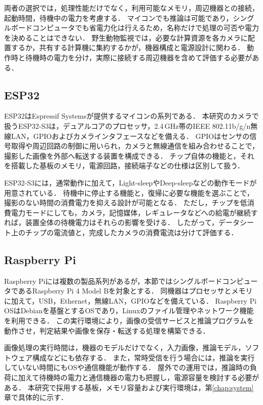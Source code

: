 両者の選択では，処理性能だけでなく，利用可能なメモリ，周辺機器との接続，起動時間，待機中の電力を考慮する．
マイコンでも推論は可能であり，シングルボードコンピュータでも省電力化は行えるため，名称だけで処理の可否や電力を決めることはできない．
野生動物監視では，必要な計算資源を各カメラに配置するか，共有する計算機に集約するかが，機器構成と電源設計に関わる．
動作時と待機時の電力を分け，実際に接続する周辺機器を含めて評価する必要がある\cite{Sato2022}．

\subsection{ESP32}
ESP32はEspressif Systemsが提供するマイコンの系列である．
本研究のカメラで扱うESP32-S3は，デュアルコアのプロセッサ，2.4\,GHz帯のIEEE 802.11b/g/n無線LAN，GPIOおよびカメラインタフェースなどを備える\cite{ESP32S3}．
GPIOはセンサの信号取得や周辺回路の制御に用いられ，カメラと無線通信を組み合わせることで，撮影した画像を外部へ転送する装置を構成できる．
チップ自体の機能と，それを搭載した基板のメモリ，電源回路，接続端子などの仕様は区別して扱う．

ESP32-S3には，通常動作に加えて，Light-sleepやDeep-sleepなどの動作モードが用意されている\cite{ESP32S3}．
待機中に停止する機能と，復帰に必要な機能を選ぶことで，撮影のない時間の消費電力を抑える設計が可能となる．
ただし，チップを低消費電力モードにしても，カメラ，記憶媒体，レギュレータなどへの給電が継続すれば，装置全体の待機電力はそれらの影響を受ける．
したがって，データシート上のチップの電流値と，完成したカメラの消費電流は分けて評価する．

\subsection{Raspberry Pi}
Raspberry Piには複数の製品系列があるが，本節ではシングルボードコンピュータであるRaspberry Pi 4 Model Bを対象とする．
同機器はプロセッサとメモリに加えて，USB，Ethernet，無線LAN，GPIOなどを備えている\cite{RaspberryPi4}．
Raspberry Pi OSはDebianを基盤とするOSであり，Linuxのファイル管理やネットワーク機能を利用できる\cite{RaspberryPiOS}．
この実行環境により，画像の受信サービスと推論プログラムを動作させ，判定結果や画像を保存・転送する処理を構築できる．

画像処理の実行時間は，機器のモデルだけでなく，入力画像，推論モデル，ソフトウェア構成などにも依存する．
また，常時受信を行う場合には，推論を実行していない時間にもOSや通信機能が動作する．
屋外での運用では，推論時の負荷に加えて待機時の電力と通信機器の電力も把握し，電源容量を検討する必要がある．
本研究で採用する基板，メモリ容量および実行環境は，第\ref{chap:system}章で具体的に示す．

